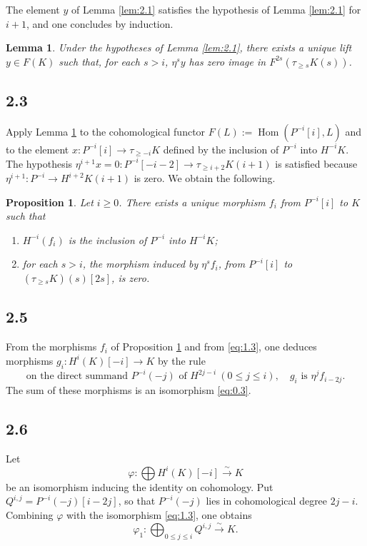 \documentclass[11pt,a4paper]{article}
\theoremstyle{plain}
\newtheorem{lemma}[theorem]{Lemma}
\newtheorem{proposition}[theorem]{Proposition}
\theoremstyle{definition}
\theoremstyle{remark}
\DeclareMathOperator{\Hom}{Hom}
\begin{document}
The element $y$ of Lemma \ref{lem:2.1} satisfies the hypothesis of Lemma \ref{lem:2.1} for $i+1$, and one concludes by induction.

\begin{lemma}\label{lem:2.2}
Under the hypotheses of Lemma \ref{lem:2.1}, there exists a unique lift $y\in F(K)$ such that, for each $s>i$, $\eta^s y$ has zero image in $F^{2s}(\tau_{\geqslant s}K(s))$.
\end{lemma}

\subsection*{2.3}
Apply Lemma \ref{lem:2.2} to the cohomological functor $F(L):=\Hom(P^{-i}[i],L)$ and to the element $x\colon P^{-i}[i]\to \tau_{\geqslant -i}K$ defined by the inclusion of $P^{-i}$ into $H^{-i}K$. The hypothesis $\eta^{i+1}x=0\colon P^{-i}[-i-2]\to\tau_{\geqslant i+2}K(i+1)$ is satisfied because $\eta^{i+1}\colon P^{-i}\to H^{i+2}K(i+1)$ is zero. We obtain the following.

\begin{proposition}\label{prop:2.4}
Let $i\geqslant0$. There exists a unique morphism $f_i$ from $P^{-i}[i]$ to $K$ such that
\begin{enumerate}[label=\textup{(\roman*)}]
\item $H^{-i}(f_i)$ is the inclusion of $P^{-i}$ into $H^{-i}K$;
\item for each $s>i$, the morphism induced by $\eta^sf_i$, from $P^{-i}[i]$ to $(\tau_{\geqslant s}K)(s)[2s]$, is zero.
\end{enumerate}
\end{proposition}

\subsection*{2.5}
From the morphisms $f_i$ of Proposition \ref{prop:2.4} and from \eqref{eq:1.3}, one deduces morphisms $g_i\colon H^i(K)[-i]\to K$ by the rule
\begin{equation}\label{eq:2.5.1}
\text{on the direct summand }P^{-i}(-j)\text{ of }H^{2j-i}\ (0\leqslant j\leqslant i),\quad g_i\text{ is }\eta^jf_{i-2j}.
\end{equation}
The sum of these morphisms is an isomorphism \eqref{eq:0.3}.

\subsection*{2.6}
Let
\[
\varphi\colon \bigoplus H^i(K)[-i]\xrightarrow{\sim}K
\]
be an isomorphism inducing the identity on cohomology. Put $Q^{i,j}=P^{-i}(-j)[i-2j]$, so that $P^{-i}(-j)$ lies in cohomological degree $2j-i$. Combining $\varphi$ with the isomorphism \eqref{eq:1.3}, one obtains
\begin{equation}\label{eq:2.6.1}
\varphi_1\colon \bigoplus_{0\leqslant j\leqslant i}Q^{i,j}\xrightarrow{\sim}K.
\end{equation}
\end{document}
